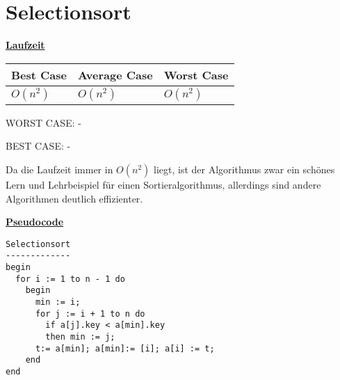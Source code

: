 \documentclass[a4paper]{report}
\begin{document}
\chapter*{Selectionsort}

\underline{\bf{Laufzeit}}

\begin{tabular}{|l|l|l|}
\hline
Best Case    & Average Case  &  Worst Case\\ \hline
$O(n^2)$ & $O(n^2)$  &  $O(n^2)$  \\ \hline
\end{tabular}

WORST CASE: - 


BEST CASE: -

Da die Laufzeit immer in $O(n^2)$ liegt, ist der Algorithmus zwar ein schönes Lern und Lehrbeispiel für einen Sortieralgorithmus, allerdings sind andere Algorithmen deutlich effizienter.


\underline{\bf{Pseudocode}}



\begin{lstlisting}
Selectionsort
-------------
begin
  for i := 1 to n - 1 do
    begin
      min := i;
      for j := i + 1 to n do 
        if a[j].key < a[min].key
        then min := j;
      t:= a[min]; a[min]:= [i]; a[i] := t;
    end
end
\end{lstlisting}
\end{document}
